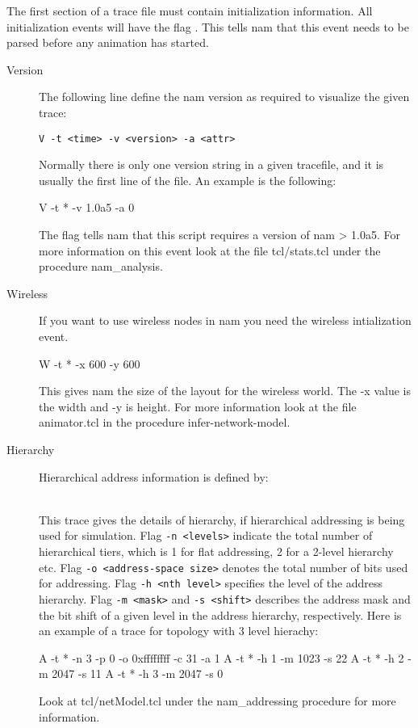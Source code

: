 The first section of a trace file must contain initialization information. All initialization events will have the flag .  This tells nam that this event needs to be parsed before any animation has started. 
\begin{description}
\item[Version]
  The following line define the nam version as required to visualize
  the given trace:
\begin{verbatim}
V -t <time> -v <version> -a <attr>
\end{verbatim}
  Normally there is only one version string in a given tracefile, and
  it is usually the first line of the file.
An example is the following:
\begin{program}
V -t * -v 1.0a5 -a 0
\end{program}

The flag  tells nam that this script requires a version of nam > 1.0a5.  For more information on this event look at the file tcl/stats.tcl under the procedure nam\_analysis.

\item[Wireless]
If you want to use wireless nodes in nam you need the wireless intialization event.
\begin{program}
W -t * -x 600 -y 600
\end{program}

This gives nam the size of the layout for the wireless world.  The -x value is the width and -y is height. For more information look at the file animator.tcl in the procedure infer-network-model.

\item[Hierarchy] Hierarchical address information is defined by:

  \\
  
  This trace gives the details of hierarchy, if hierarchical
  addressing is being used for simulation. 
  Flag {\tt -n <levels>}
  indicate the total number of hierarchical tiers, which is 1 for flat
  addressing, 2 for a 2-level hierarchy etc. 
  Flag {\tt -o <address-space size>} 
  denotes the total number of bits used for addressing. 
  Flag {\tt -h <nth level>} specifies the level of the address
  hierarchy. 
  Flag {\tt -m <mask>} and {\tt -s <shift>} describes the address mask
  and the bit shift of a given level in the address hierarchy,
  respectively. 
  Here is an example of a trace for topology with 3 level hierachy:
\begin{program}
A -t * -n 3 -p 0 -o 0xffffffff -c 31 -a 1
A -t * -h 1 -m 1023 -s 22
A -t * -h 2 -m 2047 -s 11
A -t * -h 3 -m 2047 -s 0 
\end{program}
Look at tcl/netModel.tcl under the nam\_addressing procedure for more information.


\end{description}
